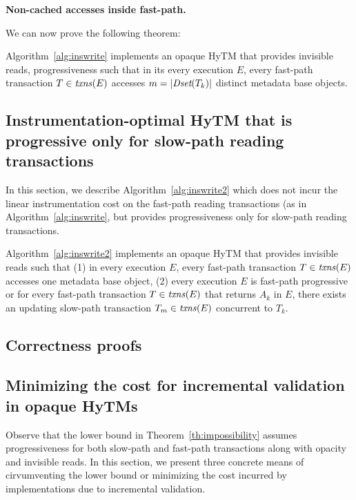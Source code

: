 \vspace{1mm}\noindent\textbf{Non-cached accesses inside fast-path.}

We can now prove the following theorem:
%
\begin{theorem}
\label{th:inswrite}
Algorithm~\ref{alg:inswrite} implements an opaque HyTM that provides invisible reads, progressiveness
such that in its every execution $E$, every fast-path transaction $T\in \ms{txns}(E)$
accesses $m=|\textit{Dset}(T_k)|$ distinct metadata base objects.
\end{theorem}
%
%

%
\subsection{Instrumentation-optimal HyTM that is progressive only for slow-path reading transactions}
\label{sec:hytm2}
%
In this section, we describe Algorithm~\ref{alg:inswrite2} which does not incur the linear instrumentation cost
on the fast-path reading transactions (as in Algorithm~\ref{alg:inswrite}, but provides progressiveness only
for slow-path reading transactions.
%
\begin{theorem}
\label{th:inswrite2}
Algorithm~\ref{alg:inswrite2} implements an opaque HyTM that provides invisible reads
such that (1) in every execution $E$,
every fast-path transaction $T\in \ms{txns}(E)$
accesses one metadata base object,
(2) every execution $E$ is fast-path progressive or for
every fast-path transaction $T\in \ms{txns}(E)$
that returns $A_k$ in $E$, there exists an updating slow-path transaction $T_m \in \ms{txns}(E)$
concurrent to $T_k$.
\end{theorem}
%
%

\subsection{Correctness proofs}
\label{sec:proofs}
%

\subsection{Minimizing the cost for incremental validation in opaque HyTMs}
\label{sec:middlepath}
%
Observe that the lower bound in Theorem~\ref{th:impossibility} assumes progressiveness for both slow-path and fast-path transactions
along with opacity and invisible reads.
In this section, we present three concrete means of cirvumventing the lower bound or minimizing the cost incurred
by implementations due to incremental validation.

